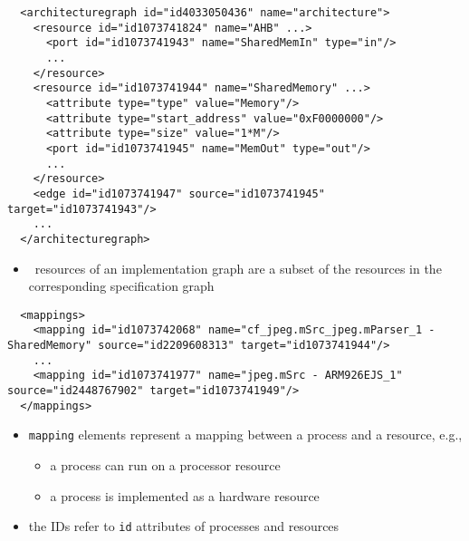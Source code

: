 \begin{frame}[fragile=singleslide]
\begin{lstlisting}
  <architecturegraph id="id4033050436" name="architecture">
    <resource id="id1073741824" name="AHB" ...>
      <port id="id1073741943" name="SharedMemIn" type="in"/>
      ...
    </resource>
    <resource id="id1073741944" name="SharedMemory" ...>
      <attribute type="type" value="Memory"/>
      <attribute type="start_address" value="0xF0000000"/>
      <attribute type="size" value="1*M"/>
      <port id="id1073741945" name="MemOut" type="out"/>
      ...
    </resource>
    <edge id="id1073741947" source="id1073741945" target="id1073741943"/>
    ...
  </architecturegraph>
\end{lstlisting}
\begin{itemize}
\item \IGX\ resources of an implementation graph are a subset of the resources in the corresponding specification graph
\end{itemize}
\end{frame}


\begin{frame}[fragile=singleslide]
\begin{lstlisting}
  <mappings>
    <mapping id="id1073742068" name="cf_jpeg.mSrc_jpeg.mParser_1 - SharedMemory" source="id2209608313" target="id1073741944"/>
    ...
    <mapping id="id1073741977" name="jpeg.mSrc - ARM926EJS_1" source="id2448767902" target="id1073741949"/>
  </mappings>
\end{lstlisting}
\begin{itemize}
\item \lstinline|mapping| elements represent a mapping between a process and a resource, e.g., 
\begin{itemize}
\item a process can run on a processor resource
\item a process is implemented as a hardware resource
\end{itemize}
\item the IDs refer to \lstinline|id| attributes of processes and resources
\end{itemize}
\end{frame}




